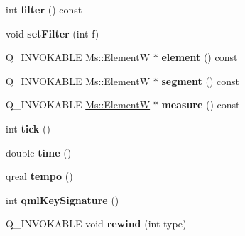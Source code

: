 \begin{DoxyCompactItemize}
\item 
\mbox{\label{class_ms_1_1_cursor_a36bc03608a65d2046f4ff30f2a7564df}} 
int {\bfseries filter} () const
\item 
\mbox{\label{class_ms_1_1_cursor_ab0efa97424764b5bf6c25e2ce0fd3ead}} 
void {\bfseries set\+Filter} (int f)
\item 
\mbox{\label{class_ms_1_1_cursor_ae1fb042e23d4d42bb3a91213bdf4dd7e}} 
Q\+\_\+\+I\+N\+V\+O\+K\+A\+B\+LE \hyperlink{class_ms_1_1_element_w}{Ms\+::\+ElementW} $\ast$ {\bfseries element} () const
\item 
\mbox{\label{class_ms_1_1_cursor_a7ed369fd6a3b00121ffa6b5e4441ff04}} 
Q\+\_\+\+I\+N\+V\+O\+K\+A\+B\+LE \hyperlink{class_ms_1_1_element_w}{Ms\+::\+ElementW} $\ast$ {\bfseries segment} () const
\item 
\mbox{\label{class_ms_1_1_cursor_a7299aecf2a9f91a4cdb687e3d1a9d2bb}} 
Q\+\_\+\+I\+N\+V\+O\+K\+A\+B\+LE \hyperlink{class_ms_1_1_element_w}{Ms\+::\+ElementW} $\ast$ {\bfseries measure} () const
\item 
\mbox{\label{class_ms_1_1_cursor_aacaf2b7b83029a60ed62c2c19dfeb12d}} 
int {\bfseries tick} ()
\item 
\mbox{\label{class_ms_1_1_cursor_aea929cf0b07bb5569f420159c29e5a77}} 
double {\bfseries time} ()
\item 
\mbox{\label{class_ms_1_1_cursor_ac72d046432d53dc773df0f2c5e27854b}} 
qreal {\bfseries tempo} ()
\item 
\mbox{\label{class_ms_1_1_cursor_a5ddd940b94b691d83bcbdac1f850144b}} 
int {\bfseries qml\+Key\+Signature} ()
\item 
\mbox{\label{class_ms_1_1_cursor_ae252197a5c007088fd0ea85e1bfc9f9f}} 
Q\+\_\+\+I\+N\+V\+O\+K\+A\+B\+LE void {\bfseries rewind} (int type)
\item 
\mbox{\label{class_ms_1_1_cursor_a3fff74c26751b47229c0062753ac5ee5}} 

\end{DoxyCompactItemize}
